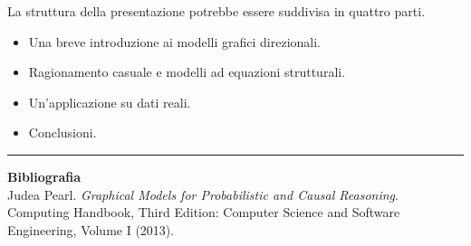 \documentclass[12pt]{exam}
\begin{document}
\noindent
La struttura della presentazione potrebbe essere suddivisa in quattro parti.

\begin{itemize}
\item Una breve introduzione ai modelli grafici direzionali.
\item Ragionamento casuale e modelli ad equazioni strutturali.
\item Un'applicazione su dati reali.
\item Conclusioni.
\end{itemize}

\noindent
\rule[2ex]{\textwidth}{2pt}
\noindent
\textbf{Bibliografia}\\
\noindent
Judea Pearl. \textit{Graphical Models for Probabilistic and Causal Reasoning}. Computing Handbook, Third Edition: Computer Science and Software Engineering, Volume I (2013).
\end{document}
